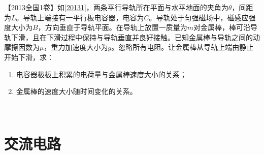 \documentclass[a4paper,9pt]{ctexart}
\begin{document}
\begin{eg} \label{em2013}
【2013全国1卷】如\cref{20131}，两条平行导轨所在平面与水平地面的夹角为$\theta$，间距为$L$。导轨上端接有一平行板电容器，电容为$C$。导轨处于匀强磁场中，磁感应强度大小为$B$，方向垂直于导轨平面。在导轨上放置一质量为$m$对金属棒，棒可沿导轨下滑，且在下滑过程中保持与导轨垂直并良好接触。已知金属棒与导轨之间的动摩擦因数为$\mu$，重力加速度大小为$g$。忽略所有电阻。让金属棒从导轨上端由静止开始下滑，求：
\begin{enumerate}
\item
电容器极板上积累的电荷量与金属棒速度大小的关系；
\item
金属棒的速度大小随时间变化的关系。
\end{enumerate}
\end{eg}
\begin{ans}
\ \\
\vspace{8cm}
\end{ans}
\section{交流电路}
\end{document}
